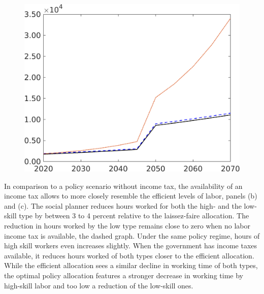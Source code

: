 \begin{figure}[h!!]
\begin{minipage}[]{0.32\textwidth}
	\end{minipage}
	\begin{minipage}[]{0.32\textwidth}
		\includegraphics[width=1\textwidth]{../../codding_model/own_basedOnFried/optimalPol_190722_tidiedUp/figures/all_10Aout22/LgLf_PercentageLfDynNT_Target_regime3_spillover0_noskill0_sep1_xgrowth0_etaa0.79_lgd0.png}
	\end{minipage}
\end{figure} 
%
In comparison to a policy scenario without income tax, the availability of an income tax allows to more closely resemble the efficient levels of labor, panels (b) and (c). 
The social planner reduces hours worked for both the high- and the low-skill type by between 3 to 4 percent relative to the laissez-faire allocation. The reduction in  hours worked by the low type remains close to zero when no labor income tax is available, the dashed graph. Under the same policy regime, hours of high skill workers even increases slightly. When the government has income taxes available, it reduces hours worked of both types closer to the efficient allocation. While the efficient allocation sees a similar decline in working time of both types, the optimal policy allocation features a stronger decrease in working time by high-skill labor and too low a reduction of the low-skill ones. 

